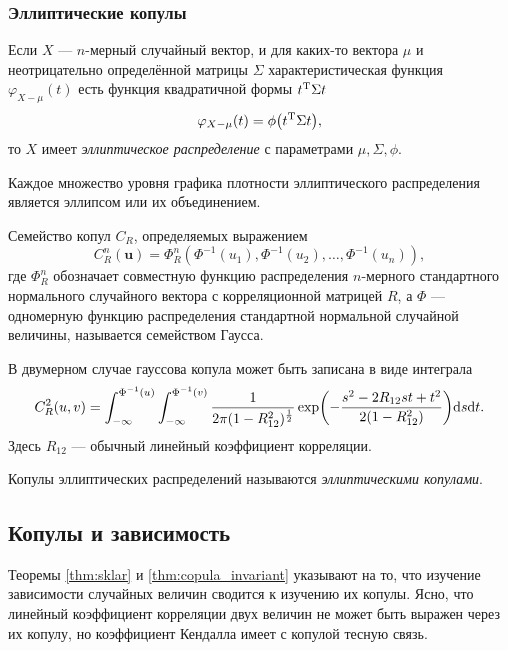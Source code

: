 \subsubsection*{Эллиптические копулы}

\begin{define}
	Если $X$ --- $n$-мерный случайный вектор, и для каких-то вектора $\mu$ и неотрицательно определённой матрицы $\Sigma$ характеристическая функция $\varphi_{X - \mu}(t)$ есть функция квадратичной формы ${t}^\mathrm{T}\Sigma t$
	\[
	\varphi_{X - \mu}(t) = \phi\brts*{\trans{t} \Sigma t},
	\]
то $X$ имеет \emph{эллиптическое распределение}\cite{Cambanis1981368} с параметрами $\mu, \Sigma, \phi$.
\end{define}

Каждое множество уровня графика плотности эллиптического распределения является эллипсом или их объединением.

\begin{define}
	Семейство копул $C_R$, определяемых выражением\cite{Embrechts01modellingdependence}
\[
C_R^n(\bm{u}) = \Phi_R^n(\Phi^{-1}(u_1), \Phi^{-1}(u_2), \ldots, \Phi^{-1}(u_n)),
\]
где $\Phi_R^n$ обозначает совместную функцию распределения $n$-мерного стандартного нормального случайного вектора с корреляционной матрицей $R$, а $\Phi$ --- одномерную функцию распределения стандартной нормальной случайной величины,
называется семейством Гаусса.
\end{define}

В двумерном случае гауссова копула может быть записана в виде интеграла
\[
C_R^2(u, v) = \int_{-\infty}^{\Phi^{-1}(u)} \int_{-\infty}^{\Phi^{-1}(v)}\frac{1}{2\pi(1 - R_{12}^2)^\frac{1}{2}}\operatorname{exp} \brts*{-\frac{s^2 - 2R_{12}st + t^2}{2(1 - R_{12}^2)}}\d s\d t.
\]
Здесь $R_{12}$ --- обычный линейный коэффициент корреляции.

\begin{define}
	Копулы эллиптических распределений называются \emph{эллиптическими копулами}.
\end{define}

\subsection*{Копулы и зависимость}

Теоремы \ref{thm:sklar} и \ref{thm:copula_invariant} указывают на то, что изучение зависимости случайных величин сводится к изучению их копулы. Ясно, что линейный коэффициент корреляции двух величин не может быть выражен через их копулу, но коэффициент Кендалла имеет с копулой тесную связь.

